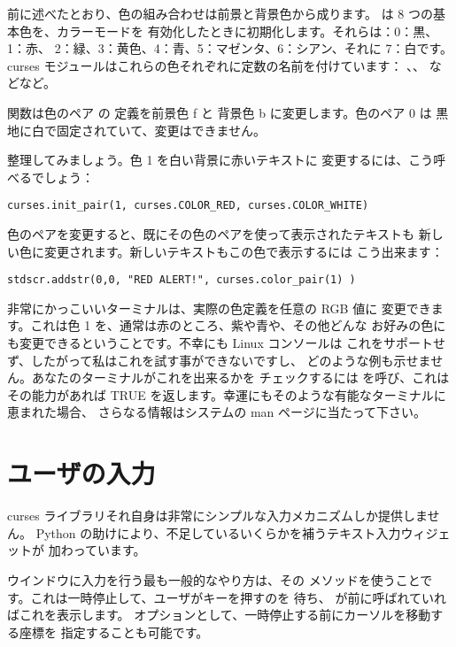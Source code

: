\documentclass{howto}
\begin{document}
前に述べたとおり、色の組み合わせは前景と背景色から成ります。
 は 8 つの基本色を、カラーモードを
有効化したときに初期化します。それらは：0：黒、1：赤、
2：緑、3：黄色、4：青、5：マゼンタ、6：シアン、それに 7：白です。
curses モジュールはこれらの色それぞれに定数の名前を付けています：
、、
などなど。

 関数は色のペア  の
定義を前景色 {f} と 背景色 {b} に変更します。色のペア 0 は
黒地に白で固定されていて、変更はできません。

整理してみましょう。色 1 を白い背景に赤いテキストに
変更するには、こう呼べるでしょう：

\begin{verbatim}
curses.init_pair(1, curses.COLOR_RED, curses.COLOR_WHITE)
\end{verbatim}

色のペアを変更すると、既にその色のペアを使って表示されたテキストも
新しい色に変更されます。新しいテキストもこの色で表示するには
こう出来ます：

\begin{verbatim}
stdscr.addstr(0,0, "RED ALERT!", curses.color_pair(1) )
\end{verbatim}

非常にかっこいいターミナルは、実際の色定義を任意の RGB 値に
変更できます。これは色 1 を、通常は赤のところ、紫や青や、その他どんな
お好みの色にも変更できるということです。不幸にも Linux コンソールは
これをサポートせず、したがって私はこれを試す事ができないですし、
どのような例も示せません。あなたのターミナルがこれを出来るかを
チェックするには  を呼び、これはその能力があれば 
TRUE を返します。幸運にもそのような有能なターミナルに恵まれた場合、
さらなる情報はシステムの man ページに当たって下さい。

\section{ユーザの入力}

curses ライブラリそれ自身は非常にシンプルな入力メカニズムしか提供しません。
Python の助けにより、不足しているいくらかを補うテキスト入力ウィジェットが
加わっています。

ウインドウに入力を行う最も一般的なやり方は、その  
メソッドを使うことです。これは一時停止して、ユーザがキーを押すのを
待ち、 が前に呼ばれていればこれを表示します。
オプションとして、一時停止する前にカーソルを移動する座標を
指定することも可能です。
\end{document}
